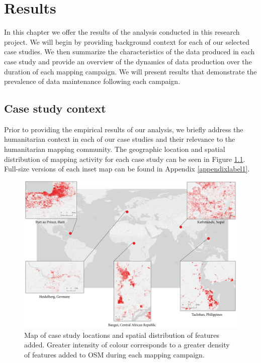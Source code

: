 \chapter{Results}
\label{chapterlabel5}

In this chapter we offer the results of the analysis conducted in this research project. We will begin by providing background context for each of our selected case studies. We then summarize the characteristics of the data produced in each case study and provide an overview of the dynamics of data production over the duration of each mapping campaign. We will present results that demonstrate the prevalence of data maintenance following each campaign. 

\section{Case study context}

Prior to providing the empirical results of our analysis, we briefly address the humanitarian context in each of our case studies and their relevance to the humanitarian mapping community. The geographic location and spatial distribution of mapping activity for each case study can be seen in Figure \ref{fig:map}. Full-size versions of each inset map can be found in Appendix \ref{appendixlabel1}. 

\begin{figure} %
    \centering %
    \includegraphics[width = \textwidth]{Images/sum_map.png} %
    \caption[Map of case study locations and spatial distribution of features added.]{Map of case study locations and spatial distribution of features added. Greater intensity of colour corresponds to a greater density of features added to OSM during each mapping campaign.} %
    \label{fig:map} %
\end{figure}

